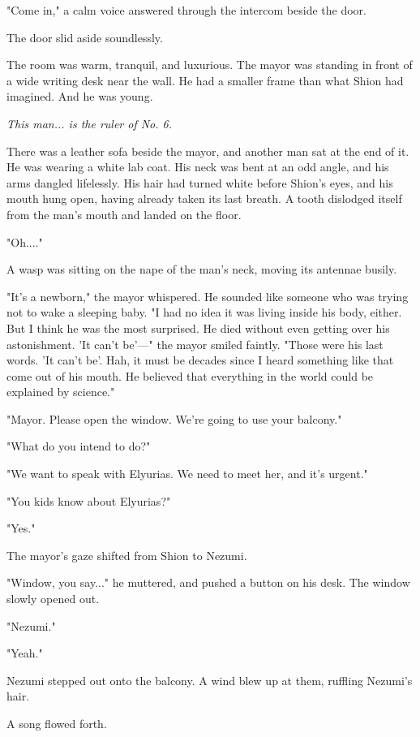 "Come in," a calm voice answered through the intercom beside the door.

The door slid aside soundlessly.

The room was warm, tranquil, and luxurious. The mayor was standing in
front of a wide writing desk near the wall. He had a smaller frame than
what Shion had imagined. And he was young.

\emph{This man... is the ruler of No. 6.}

There was a leather sofa beside the mayor, and another man sat at the
end of it. He was wearing a white lab coat. His neck was bent at an odd
angle, and his arms dangled lifelessly. His hair had turned white before
Shion's eyes, and his mouth hung open, having already taken its last
breath. A tooth dislodged itself from the man's mouth and landed on the
floor.

"Oh...."

A wasp was sitting on the nape of the man's neck, moving its antennae
busily.

"It's a newborn," the mayor whispered. He sounded like someone who was
trying not to wake a sleeping baby. "I had no idea it was living inside
his body, either. But I think he was the most surprised. He died without
even getting over his astonishment. 'It can't be'---" the mayor smiled
faintly. "Those were his last words. 'It can't be'. Hah, it must be
decades since I heard something like that come out of his mouth. He
believed that everything in the world could be explained by science."

"Mayor. Please open the window. We're going to use your balcony."

"What do you intend to do?"

"We want to speak with Elyurias. We need to meet her, and it's urgent."

"You kids know about Elyurias?"

"Yes."

The mayor's gaze shifted from Shion to Nezumi.

"Window, you say..." he muttered, and pushed a button on his desk. The
window slowly opened out.

"Nezumi."

"Yeah."

Nezumi stepped out onto the balcony. A wind blew up at them, ruffling
Nezumi's hair.

A song flowed forth.


